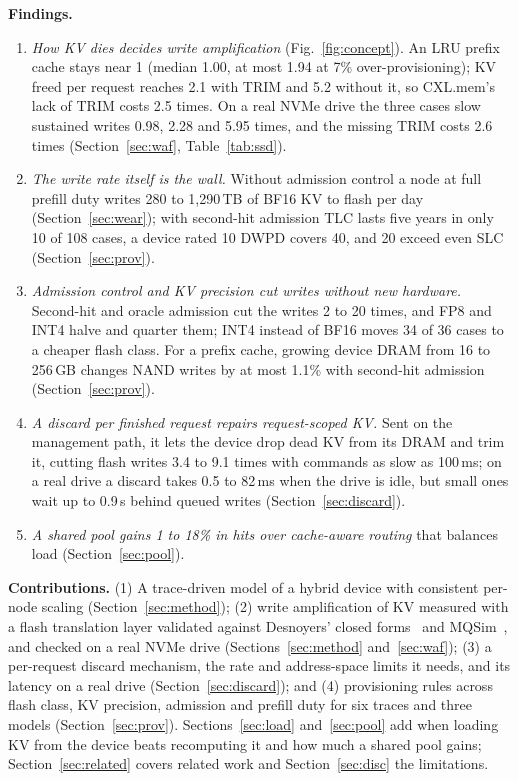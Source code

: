 \documentclass[acmsmall,screen,review]{acmart}
\begin{document}
\textbf{Findings.}
\begin{enumerate}
\item \emph{How KV dies decides write amplification} (Fig.~\ref{fig:concept}). An LRU prefix cache
stays near 1 (median 1.00, at most 1.94 at 7\% over-provisioning); KV freed per request reaches 2.1
with TRIM and 5.2 without it, so CXL.mem's lack of TRIM costs 2.5 times. On a real NVMe drive the
three cases slow sustained writes 0.98, 2.28 and 5.95 times, and the missing TRIM costs 2.6 times
(Section~\ref{sec:waf}, Table~\ref{tab:ssd}).
\item \emph{The write rate itself is the wall.} Without admission control a node at full prefill
duty writes 280 to 1,290\,TB of BF16 KV to flash per day (Section~\ref{sec:wear}); with second-hit
admission TLC lasts five years in only 10 of 108 cases, a device rated 10 DWPD covers 40, and 20
exceed even SLC (Section~\ref{sec:prov}).
\item \emph{Admission control and KV precision cut writes without new hardware.} Second-hit and oracle admission
cut the writes 2 to 20 times, and FP8 and INT4 halve and quarter them; INT4 instead of BF16 moves 34
of 36 cases to a cheaper flash class. For a prefix cache, growing device DRAM from 16 to 256\,GB
changes NAND writes by at most 1.1\% with second-hit admission (Section~\ref{sec:prov}).
\item \emph{A discard per finished request repairs request-scoped KV.} Sent on the management path,
it lets the device drop dead KV from its DRAM and trim it, cutting flash writes 3.4 to 9.1 times
with commands as slow as 100\,ms; on a real drive a discard takes 0.5 to 82\,ms when the drive is
idle, but small ones wait up to 0.9\,s behind queued writes (Section~\ref{sec:discard}).
\item \emph{A shared pool gains 1 to 18\% in hits over cache-aware routing} that balances load (Section~\ref{sec:pool}).
\end{enumerate}

\textbf{Contributions.} (1) A trace-driven model of a hybrid device with consistent per-node scaling
(Section~\ref{sec:method}); (2) write amplification of KV measured with a flash translation layer
validated against Desnoyers' closed forms~\cite{desnoyers} and MQSim~\cite{mqsim}, and checked on a
real NVMe drive (Sections~\ref{sec:method} and~\ref{sec:waf}); (3) a per-request discard mechanism,
the rate and address-space limits it needs, and its latency on a real drive
(Section~\ref{sec:discard}); and (4) provisioning rules across flash
class, KV precision, admission and prefill duty for six traces and three models
(Section~\ref{sec:prov}). Sections~\ref{sec:load} and~\ref{sec:pool} add when loading KV from the
device beats recomputing it and how much a shared pool gains; Section~\ref{sec:related} covers
related work and Section~\ref{sec:disc} the limitations.
\end{document}
